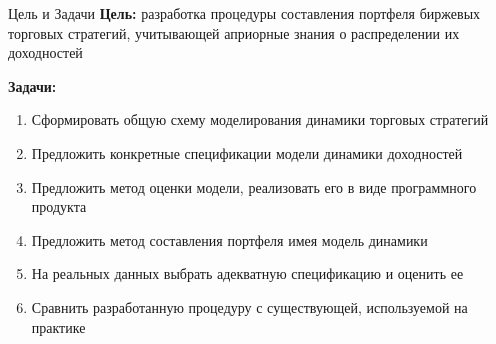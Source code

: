 \documentclass[12pt]{beamer}
\begin{document}
\begin{frame}{Цель и Задачи}
\textbf{Цель:} разработка процедуры составления портфеля биржевых торговых стратегий, учитывающей априорные знания о распределении их доходностей

\textbf{Задачи:}

\begin{enumerate}
	\small
	\item Сформировать общую схему моделирования динамики торговых стратегий
	\item Предложить конкретные спецификации модели динамики доходностей
	\item Предложить метод оценки модели, реализовать его в виде программного продукта
	\item Предложить метод составления портфеля имея модель динамики
	\item На реальных данных выбрать адекватную спецификацию и оценить ее
	\item Сравнить разработанную процедуру с существующей, используемой на практике
\end{enumerate}
\end{frame}
\end{document}

